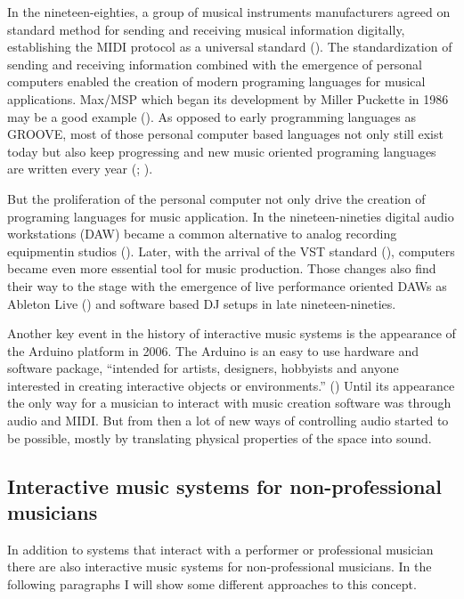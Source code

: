In the nineteen-eighties, a group of musical instruments manufacturers agreed on standard method for sending and receiving musical information digitally, establishing the MIDI protocol as a universal standard (\cite{web:quinn}). The standardization of sending and receiving information combined with the emergence of personal computers enabled the creation of modern programing languages for musical applications. Max/MSP which began its development by Miller Puckette in 1986 may be a good example (\cite[page 16]{winkler01}). As opposed to early programming languages as GROOVE, most of those personal computer based languages not only still exist today but also keep progressing and new music oriented programing languages are written every year (\cite{web:chuck}; \cite{web:usine}).

But the proliferation of the personal computer not only drive the creation of programing languages for music application. In the nineteen-nineties digital audio workstations (DAW) became a common alternative to analog recording equipmentin studios (). Later, with the arrival of the VST standard (\cite{web:steinberg}), computers became even more essential tool for music production. Those changes also find their way to the stage with the emergence of live performance oriented DAWs as Ableton Live (\cite{web:live}) and software based DJ setups in late nineteen-nineties.

Another key event in the history of interactive music systems is the appearance of the Arduino platform in 2006. The Arduino is an easy to use hardware and software package, ``intended for artists, designers, hobbyists and anyone interested in creating interactive objects or environments.'' (\cite{web:arduino}) Until its appearance the only way for a musician to interact with music creation software was through audio and MIDI. But from then a lot of new ways of controlling audio started to be possible, mostly by translating physical properties of the space into sound.

\subsection{Interactive music systems for non-professional musicians}

In addition to systems that interact with a performer or professional musician there are also interactive music systems for non-professional musicians. In the following paragraphs I will show some different approaches to this concept.

